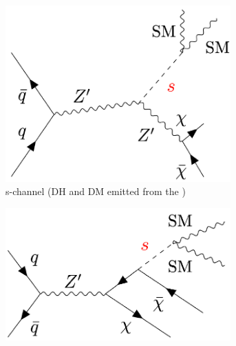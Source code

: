 \begin{figure}[hp]
	\centering
	\begin{subfigure}[t]{0.49\textwidth}
	\centering
	\includegraphics[width=0.95\textwidth]{Figures/2/Fey1.pdf}
%
%
%
%
%
%
	\caption{s-channel (DH and DM emitted from the \Zprime)}
	\end{subfigure}
		\begin{subfigure}[t]{0.45\textwidth}
	\centering
	\includegraphics[width=0.95\textwidth]{Figures/2/Fey2.pdf}

\end{subfigure}
\end{figure}
